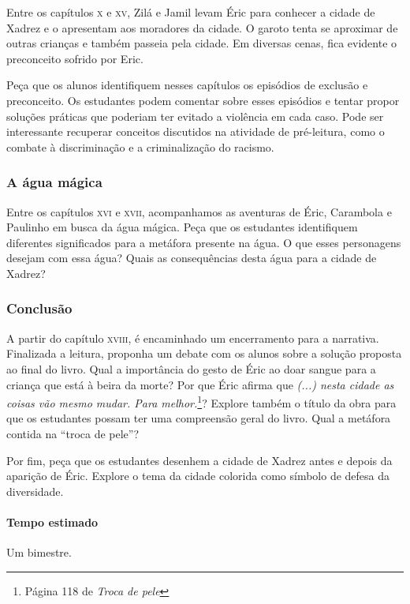 \documentclass[11pt]{extarticle}
\begin{document}
Entre os capítulos \textsc{x} e \textsc{xv}, Zilá e Jamil levam Éric para conhecer a cidade de Xadrez e o apresentam aos moradores da cidade. O garoto tenta se aproximar de outras crianças e também passeia pela cidade. Em diversas cenas, fica evidente o preconceito sofrido por Eric.

Peça que os alunos identifiquem nesses capítulos os episódios de exclusão e preconceito. Os estudantes podem comentar sobre esses episódios e tentar propor soluções práticas que poderiam ter evitado a violência em cada caso. Pode ser interessante recuperar conceitos discutidos na atividade de pré-leitura, como o combate à discriminação e a criminalização do racismo.


\subsubsection{A água mágica}

Entre os capítulos \textsc{xvi} e \textsc{xvii}, acompanhamos as aventuras de Éric, Carambola e Paulinho em busca da água mágica. Peça que os estudantes identifiquem diferentes significados para a metáfora presente na água. O que esses personagens desejam com essa água? Quais as consequências desta água para a cidade de Xadrez?

\subsubsection{Conclusão}

A partir do capítulo \textsc{xviii}, é encaminhado um encerramento para a narrativa. Finalizada a leitura, proponha um debate com os alunos sobre a solução proposta ao final do livro. Qual a importância do gesto de Éric ao doar sangue para a criança que está à beira da morte? Por que Éric afirma que \textit{(...) nesta cidade as coisas vão mesmo mudar. Para melhor.}\footnote{Página 118 de \textit{Troca de pele}}? Explore também o título da obra para que os estudantes possam ter uma compreensão geral do livro. Qual a metáfora contida na ``troca de pele''? 

Por fim, peça que os estudantes desenhem a cidade de Xadrez antes e depois da aparição de Éric. Explore o tema da cidade colorida como símbolo de defesa da diversidade.

\paragraph{Tempo estimado} Um bimestre.
\end{document}
